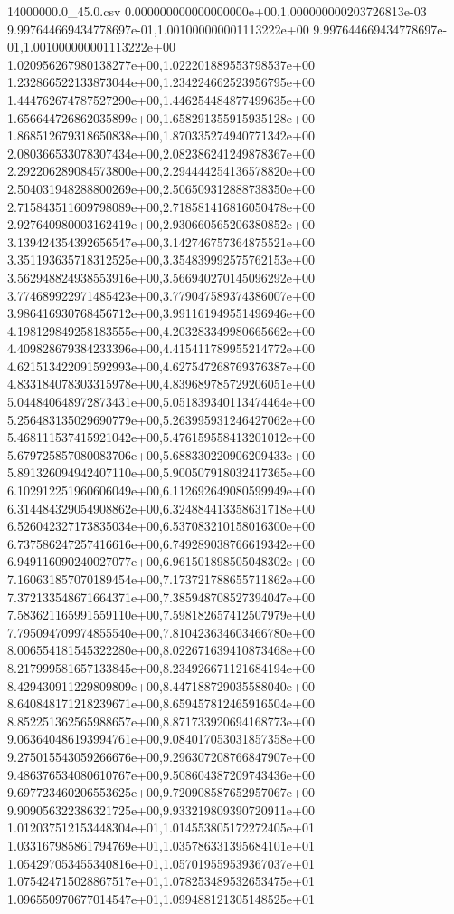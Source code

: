 \begin{filecontents*}{14000000.0_45.0.csv}
0.000000000000000000e+00,1.000000000203726813e-03
9.997644669434778697e-01,1.001000000001113222e+00
9.997644669434778697e-01,1.001000000001113222e+00
1.020956267980138277e+00,1.022201889553798537e+00
1.232866522133873044e+00,1.234224662523956795e+00
1.444762674787527290e+00,1.446254484877499635e+00
1.656644726862035899e+00,1.658291355915935128e+00
1.868512679318650838e+00,1.870335274940771342e+00
2.080366533078307434e+00,2.082386241249878367e+00
2.292206289084573800e+00,2.294444254136578820e+00
2.504031948288800269e+00,2.506509312888738350e+00
2.715843511609798089e+00,2.718581416816050478e+00
2.927640980003162419e+00,2.930660565206380852e+00
3.139424354392656547e+00,3.142746757364875521e+00
3.351193635718312525e+00,3.354839992575762153e+00
3.562948824938553916e+00,3.566940270145096292e+00
3.774689922971485423e+00,3.779047589374386007e+00
3.986416930768456712e+00,3.991161949551496946e+00
4.198129849258183555e+00,4.203283349980665662e+00
4.409828679384233396e+00,4.415411789955214772e+00
4.621513422091592993e+00,4.627547268769376387e+00
4.833184078303315978e+00,4.839689785729206051e+00
5.044840648972873431e+00,5.051839340113474464e+00
5.256483135029690779e+00,5.263995931246427062e+00
5.468111537415921042e+00,5.476159558413201012e+00
5.679725857080083706e+00,5.688330220906209433e+00
5.891326094942407110e+00,5.900507918032417365e+00
6.102912251960606049e+00,6.112692649080599949e+00
6.314484329054908862e+00,6.324884413358631718e+00
6.526042327173835034e+00,6.537083210158016300e+00
6.737586247257416616e+00,6.749289038766619342e+00
6.949116090240027077e+00,6.961501898505048302e+00
7.160631857070189454e+00,7.173721788655711862e+00
7.372133548671664371e+00,7.385948708527394047e+00
7.583621165991559110e+00,7.598182657412507979e+00
7.795094709974855540e+00,7.810423634603466780e+00
8.006554181545322280e+00,8.022671639410873468e+00
8.217999581657133845e+00,8.234926671121684194e+00
8.429430911229809809e+00,8.447188729035588040e+00
8.640848171218239671e+00,8.659457812465916504e+00
8.852251362565988657e+00,8.871733920694168773e+00
9.063640486193994761e+00,9.084017053031857358e+00
9.275015543059266676e+00,9.296307208766847907e+00
9.486376534080610767e+00,9.508604387209743436e+00
9.697723460206553625e+00,9.720908587652957067e+00
9.909056322386321725e+00,9.933219809390720911e+00
1.012037512153448304e+01,1.014553805172272405e+01
1.033167985861794769e+01,1.035786331395684101e+01
1.054297053455340816e+01,1.057019559539367037e+01
1.075424715028867517e+01,1.078253489532653475e+01
1.096550970677014547e+01,1.099488121305148525e+01

\end{filecontents*}
